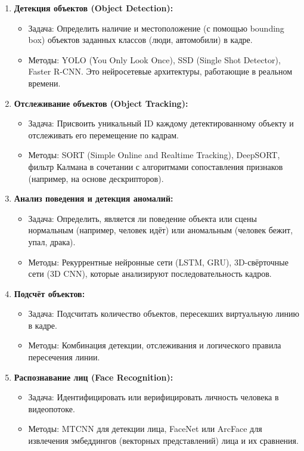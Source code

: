 \documentclass[12pt,a4paper]{article}
\begin{document}
\begin{enumerate}
    \item \textbf{Детекция объектов (Object Detection):}
    \begin{itemize}
        \item Задача: Определить наличие и местоположение (с помощью bounding box) объектов заданных классов (люди, автомобили) в кадре.
        \item Методы: YOLO (You Only Look Once), SSD (Single Shot Detector), Faster R-CNN. Это нейросетевые архитектуры, работающие в реальном времени.
    \end{itemize}
    \item \textbf{Отслеживание объектов (Object Tracking):}
    \begin{itemize}
        \item Задача: Присвоить уникальный ID каждому детектированному объекту и отслеживать его перемещение по кадрам.
        \item Методы: SORT (Simple Online and Realtime Tracking), DeepSORT, фильтр Калмана в сочетании с алгоритмами сопоставления признаков (например, на основе дескрипторов).
    \end{itemize}
    \item \textbf{Анализ поведения и детекция аномалий:}
    \begin{itemize}
        \item Задача: Определить, является ли поведение объекта или сцены нормальным (например, человек идёт) или аномальным (человек бежит, упал, драка).
        \item Методы: Рекуррентные нейронные сети (LSTM, GRU), 3D-свёрточные сети (3D CNN), которые анализируют последовательность кадров.
    \end{itemize}
    \item \textbf{Подсчёт объектов:}
    \begin{itemize}
        \item Задача: Подсчитать количество объектов, пересекших виртуальную линию в кадре.
        \item Методы: Комбинация детекции, отслеживания и логического правила пересечения линии.
    \end{itemize}
    \item \textbf{Распознавание лиц (Face Recognition):}
    \begin{itemize}
        \item Задача: Идентифицировать или верифицировать личность человека в видеопотоке.
        \item Методы: MTCNN для детекции лица, FaceNet или ArcFace для извлечения эмбеддингов (векторных представлений) лица и их сравнения.
    \end{itemize}
\end{enumerate}
\end{document}
